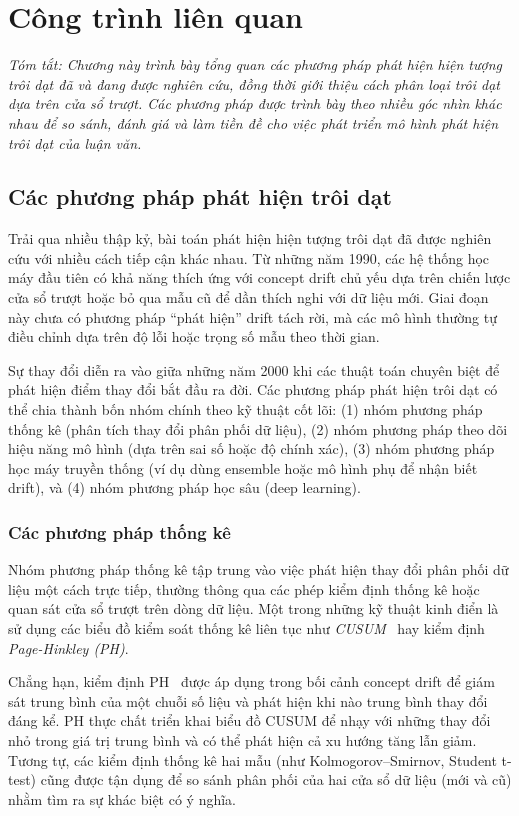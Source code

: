 \chapter{Công trình liên quan}
\label{chap:related-work}

\textit{Tóm tắt: Chương này trình bày tổng quan các phương pháp phát hiện hiện tượng trôi dạt đã và đang được nghiên cứu, đồng thời giới thiệu cách phân loại trôi dạt dựa trên cửa sổ trượt. Các phương pháp được trình bày theo nhiều góc nhìn khác nhau để so sánh, đánh giá và làm tiền đề cho việc phát triển mô hình phát hiện trôi dạt của luận văn.}

\section{Các phương pháp phát hiện trôi dạt}
Trải qua nhiều thập kỷ, bài toán phát hiện hiện tượng trôi dạt đã được nghiên cứu với nhiều cách tiếp cận khác nhau.
Từ những năm 1990, các hệ thống học máy đầu tiên có khả năng thích ứng với concept drift chủ yếu dựa trên chiến lược cửa sổ trượt hoặc bỏ qua mẫu cũ để dần thích nghi với dữ liệu mới. Giai đoạn này chưa có phương pháp ``phát hiện'' drift tách rời, mà các mô hình thường tự điều chỉnh dựa trên độ lỗi hoặc trọng số mẫu theo thời gian.

Sự thay đổi diễn ra vào giữa những năm 2000 khi các thuật toán chuyên biệt để phát hiện điểm thay đổi bắt đầu ra đời. Các phương pháp phát hiện trôi dạt có thể chia thành bốn nhóm chính theo kỹ thuật cốt lõi: (1) nhóm phương pháp thống kê (phân tích thay đổi phân phối dữ liệu), (2) nhóm phương pháp theo dõi hiệu năng mô hình (dựa trên sai số hoặc độ chính xác), (3) nhóm phương pháp học máy truyền thống (ví dụ dùng ensemble hoặc mô hình phụ để nhận biết drift), và (4) nhóm phương pháp học sâu (deep learning).
\subsection{Các phương pháp thống kê}
Nhóm phương pháp thống kê tập trung vào việc phát hiện thay đổi phân phối dữ liệu một cách trực tiếp, thường
thông qua các phép kiểm định thống kê hoặc quan sát cửa sổ trượt trên dòng dữ liệu. Một trong những kỹ thuật
kinh điển là sử dụng các biểu đồ kiểm soát thống kê liên tục như \textit{CUSUM}~\cite{page1954continuous} hay kiểm định \textit{Page-Hinkley (PH)}.

Chẳng hạn, kiểm định PH~\cite{page1954continuous,hinkley1971cumulative} được áp dụng trong bối cảnh concept drift để giám sát trung bình của một chuỗi
số liệu và phát hiện khi nào trung bình thay đổi đáng kể. PH thực chất triển khai biểu đồ CUSUM để nhạy với những thay đổi
nhỏ trong giá trị trung bình và có thể phát hiện cả xu hướng tăng lẫn giảm. Tương tự, các kiểm định thống kê hai
mẫu (như Kolmogorov–Smirnov, Student t-test) cũng được tận dụng để so sánh phân phối của hai cửa sổ dữ liệu (mới và cũ)
nhằm tìm ra sự khác biệt có ý nghĩa.

